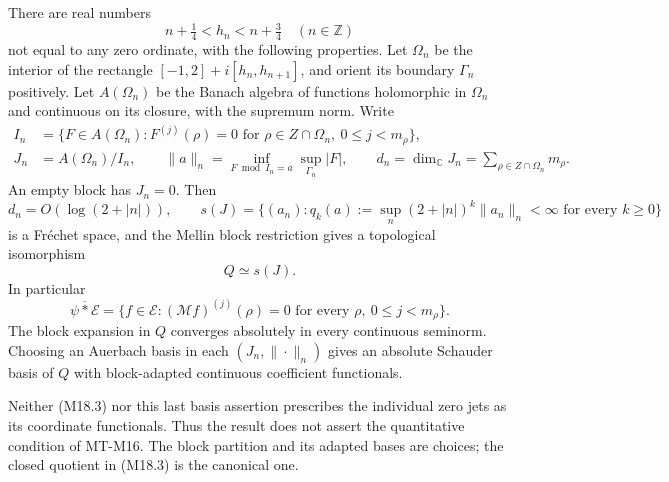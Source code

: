 \documentclass[11pt,a4paper]{article}
\begin{document}
There are real numbers
\[
 n+\tfrac14<h_n<n+\tfrac34\quad(n\in\mathbb Z)
\]
not equal to any zero ordinate, with the following properties.
Let \(\Omega_n\) be the interior of the rectangle
\([-1,2]+i[h_n,h_{n+1}]\), and orient its boundary
\(\Gamma_n\) positively.  Let \(A(\Omega_n)\) be the Banach
algebra of functions holomorphic in \(\Omega_n\) and continuous
on its closure, with the supremum norm.  Write
\[
 \begin{split}
 I_n&=\{F\in A(\Omega_n):
        F^{(j)}(\rho)=0\text{ for }\rho\in Z\cap\Omega_n,\
                                  0\le j<m_\rho\},\\
 J_n&=A(\Omega_n)/I_n,\qquad
 \|a\|_n=\inf_{F\bmod I_n=a}\sup_{\Gamma_n}|F|,\qquad
 d_n=\dim_{\mathbb C}J_n=\sum_{\rho\in Z\cap\Omega_n}m_\rho .
 \end{split}                                                    \tag{M18.1}
\]
An empty block has \(J_n=0\).  Then
\[
 d_n=O(\log(2+|n|)),\qquad
 s(J)=\{(a_n):q_k(a):=\sup_n(2+|n|)^k\|a_n\|_n<\infty
                                  \text{ for every }k\ge0\}      \tag{M18.2}
\]
is a Fr\'echet space, and the Mellin block restriction gives a
topological isomorphism
\[
 Q\simeq s(J).                                                    \tag{M18.3}
\]
In particular
\[
 \overline{\psi*\mathcal E}
 =\{f\in\mathcal E:(\mathcal Mf)^{(j)}(\rho)=0
                         \text{ for every }\rho,\ 0\le j<m_\rho\}.
                                                                  \tag{M18.4}
\]
The block expansion in \(Q\) converges absolutely in every
continuous seminorm.  Choosing an Auerbach basis in each
\((J_n,\|\cdot\|_n)\) gives an absolute Schauder basis of \(Q\)
with block-adapted continuous coefficient functionals.

Neither (M18.3) nor this last basis assertion prescribes the
individual zero jets as its coordinate functionals.  Thus the
result does not assert the quantitative condition of MT-M16.
The block partition and its adapted bases are choices; the
closed quotient in (M18.3) is the canonical one.
\end{document}
